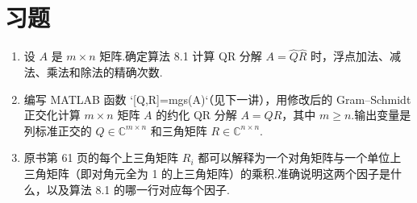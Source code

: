 \documentclass[UTF8,fontset=none,12pt]{ctexart}
\newcommand{\C}{\mathbb{C}}
\theoremstyle{definition}
\begin{document}
\section*{习题}

\begin{enumerate}[label=\textbf{8.\arabic*}]
    \item 设 $A$ 是 $m\times n$ 矩阵.确定算法 8.1 计算 QR 分解 $A=\widehat Q\widehat R$ 时，浮点加法、减法、乘法和除法的精确次数.

    \item 编写 MATLAB 函数 `[Q,R]=mgs(A)`（见下一讲），用修改后的 Gram--Schmidt 正交化计算 $m\times n$ 矩阵 $A$ 的约化 QR 分解 $A=QR$，其中 $m\ge n$.输出变量是列标准正交的 $Q\in\C^{m\times n}$ 和三角矩阵 $R\in\C^{n\times n}$.

    \item 原书第 61 页的每个上三角矩阵 $R_i$ 都可以解释为一个对角矩阵与一个单位上三角矩阵（即对角元全为 1 的上三角矩阵）的乘积.准确说明这两个因子是什么，以及算法 8.1 的哪一行对应每个因子.
\end{enumerate}
\end{document}
